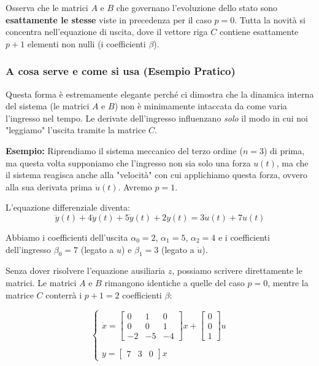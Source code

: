 \documentclass[a4paper,12pt]{article}
\begin{document}
	Osserva che le matrici $A$ e $B$ che governano l'evoluzione dello stato sono \textbf{esattamente le stesse} viste in precedenza per il caso $p = 0$. Tutta la novità si concentra nell'equazione di uscita, dove il vettore riga $C$ contiene esattamente $p + 1$ elementi non nulli (i coefficienti $\beta$).
	
	\vspace{0.5cm}
	
	\subsubsection*{A cosa serve e come si usa (Esempio Pratico)}
	
	Questa forma è estremamente elegante perché ci dimostra che la dinamica interna del sistema (le matrici $A$ e $B$) non è minimamente intaccata da come varia l'ingresso nel tempo. Le derivate dell'ingresso influenzano \textit{solo} il modo in cui noi "leggiamo" l'uscita tramite la matrice $C$.
	
	\textbf{Esempio:}
	Riprendiamo il sistema meccanico del terzo ordine ($n=3$) di prima, ma questa volta supponiamo che l'ingresso non sia solo una forza $u(t)$, ma che il sistema reagisca anche alla "velocità" con cui applichiamo questa forza, ovvero alla sua derivata prima $\dot{u}(t)$. Avremo $p=1$.
	
	L'equazione differenziale diventa:
	\[
	\dddot{y}(t) + 4\ddot{y}(t) + 5\dot{y}(t) + 2y(t) = 3\dot{u}(t) + 7u(t)
	\]
	
	Abbiamo i coefficienti dell'uscita $\alpha_0 = 2$, $\alpha_1 = 5$, $\alpha_2 = 4$ e i coefficienti dell'ingresso $\beta_0 = 7$ (legato a $u$) e $\beta_1 = 3$ (legato a $\dot{u}$).
	
	Senza dover risolvere l'equazione ausiliaria $z$, possiamo scrivere direttamente le matrici.
	Le matrici $A$ e $B$ rimangono identiche a quelle del caso $p=0$, mentre la matrice $C$ conterrà i $p+1 = 2$ coefficienti $\beta$:
	
	\[
	\begin{cases}
		\dot{x} = 
		\begin{bmatrix} 
			0 & 1 & 0 \\ 
			0 & 0 & 1 \\ 
			-2 & -5 & -4 
		\end{bmatrix} 
		x + 
		\begin{bmatrix} 
			0 \\ 
			0 \\ 
			1 
		\end{bmatrix} 
		u 
		\\
		\\
		y = 
		\begin{bmatrix} 
			7 & 3 & 0 
		\end{bmatrix} 
		x
	\end{cases}
	\]
	
\end{document}
